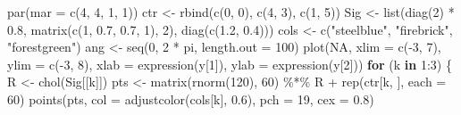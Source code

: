 \documentclass[
  letterpaper,
  DIV=11,
  numbers=noendperiod]{scrreprt}
\newenvironment{Shaded}{\begin{snugshade}}{\end{snugshade}}
\newcommand{\AttributeTok}[1]{\textcolor[rgb]{0.40,0.45,0.13}{#1}}
\newcommand{\ConstantTok}[1]{\textcolor[rgb]{0.56,0.35,0.01}{#1}}
\newcommand{\ControlFlowTok}[1]{\textcolor[rgb]{0.00,0.23,0.31}{\textbf{#1}}}
\newcommand{\DecValTok}[1]{\textcolor[rgb]{0.68,0.00,0.00}{#1}}
\newcommand{\FloatTok}[1]{\textcolor[rgb]{0.68,0.00,0.00}{#1}}
\newcommand{\FunctionTok}[1]{\textcolor[rgb]{0.28,0.35,0.67}{#1}}
\newcommand{\NormalTok}[1]{\textcolor[rgb]{0.00,0.23,0.31}{#1}}
\newcommand{\OtherTok}[1]{\textcolor[rgb]{0.00,0.23,0.31}{#1}}
\newcommand{\SpecialCharTok}[1]{\textcolor[rgb]{0.37,0.37,0.37}{#1}}
\newcommand{\StringTok}[1]{\textcolor[rgb]{0.13,0.47,0.30}{#1}}
\begin{document}
\begin{Shaded}
\begin{Highlighting}[]
\FunctionTok{par}\NormalTok{(}\AttributeTok{mar =} \FunctionTok{c}\NormalTok{(}\DecValTok{4}\NormalTok{, }\DecValTok{4}\NormalTok{, }\DecValTok{1}\NormalTok{, }\DecValTok{1}\NormalTok{))}
\NormalTok{ctr }\OtherTok{\textless{}{-}} \FunctionTok{rbind}\NormalTok{(}\FunctionTok{c}\NormalTok{(}\DecValTok{0}\NormalTok{, }\DecValTok{0}\NormalTok{), }\FunctionTok{c}\NormalTok{(}\DecValTok{4}\NormalTok{, }\DecValTok{3}\NormalTok{), }\FunctionTok{c}\NormalTok{(}\DecValTok{1}\NormalTok{, }\DecValTok{5}\NormalTok{))}
\NormalTok{Sig }\OtherTok{\textless{}{-}} \FunctionTok{list}\NormalTok{(}\FunctionTok{diag}\NormalTok{(}\DecValTok{2}\NormalTok{) }\SpecialCharTok{*} \FloatTok{0.8}\NormalTok{, }\FunctionTok{matrix}\NormalTok{(}\FunctionTok{c}\NormalTok{(}\DecValTok{1}\NormalTok{, }\FloatTok{0.7}\NormalTok{, }\FloatTok{0.7}\NormalTok{, }\DecValTok{1}\NormalTok{), }\DecValTok{2}\NormalTok{), }\FunctionTok{diag}\NormalTok{(}\FunctionTok{c}\NormalTok{(}\FloatTok{1.2}\NormalTok{, }\FloatTok{0.4}\NormalTok{)))}
\NormalTok{cols }\OtherTok{\textless{}{-}} \FunctionTok{c}\NormalTok{(}\StringTok{"steelblue"}\NormalTok{, }\StringTok{"firebrick"}\NormalTok{, }\StringTok{"forestgreen"}\NormalTok{)}
\NormalTok{ang }\OtherTok{\textless{}{-}} \FunctionTok{seq}\NormalTok{(}\DecValTok{0}\NormalTok{, }\DecValTok{2} \SpecialCharTok{*}\NormalTok{ pi, }\AttributeTok{length.out =} \DecValTok{100}\NormalTok{)}
\FunctionTok{plot}\NormalTok{(}\ConstantTok{NA}\NormalTok{, }\AttributeTok{xlim =} \FunctionTok{c}\NormalTok{(}\SpecialCharTok{{-}}\DecValTok{3}\NormalTok{, }\DecValTok{7}\NormalTok{), }\AttributeTok{ylim =} \FunctionTok{c}\NormalTok{(}\SpecialCharTok{{-}}\DecValTok{3}\NormalTok{, }\DecValTok{8}\NormalTok{),}
     \AttributeTok{xlab =} \FunctionTok{expression}\NormalTok{(y[}\DecValTok{1}\NormalTok{]), }\AttributeTok{ylab =} \FunctionTok{expression}\NormalTok{(y[}\DecValTok{2}\NormalTok{]))}
\ControlFlowTok{for}\NormalTok{ (k }\ControlFlowTok{in} \DecValTok{1}\SpecialCharTok{:}\DecValTok{3}\NormalTok{) \{}
\NormalTok{  R }\OtherTok{\textless{}{-}} \FunctionTok{chol}\NormalTok{(Sig[[k]])}
\NormalTok{  pts }\OtherTok{\textless{}{-}} \FunctionTok{matrix}\NormalTok{(}\FunctionTok{rnorm}\NormalTok{(}\DecValTok{120}\NormalTok{), }\DecValTok{60}\NormalTok{) }\SpecialCharTok{\%*\%}\NormalTok{ R }\SpecialCharTok{+} \FunctionTok{rep}\NormalTok{(ctr[k, ], }\AttributeTok{each =} \DecValTok{60}\NormalTok{)}
  \FunctionTok{points}\NormalTok{(pts, }\AttributeTok{col =} \FunctionTok{adjustcolor}\NormalTok{(cols[k], }\FloatTok{0.6}\NormalTok{), }\AttributeTok{pch =} \DecValTok{19}\NormalTok{, }\AttributeTok{cex =} \FloatTok{0.8}\NormalTok{)}

\end{Highlighting}
\end{Shaded}
\end{document}
